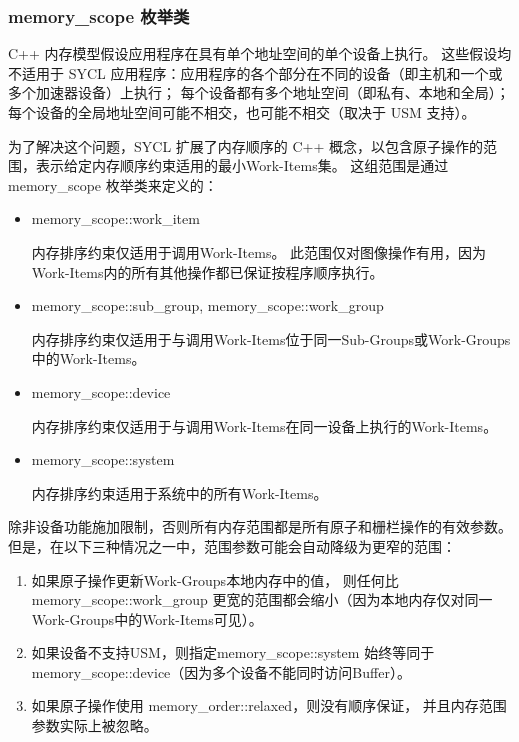\subsubsection{memory\_scope 枚举类}
C++ 内存模型假设应用程序在具有单个地址空间的单个设备上执行。 
这些假设均不适用于 SYCL 应用程序：应用程序的各个部分在不同的设备（即主机和一个或多个加速器设备）上执行； 
每个设备都有多个地址空间（即私有、本地和全局）； 
每个设备的全局地址空间可能不相交，也可能不相交（取决于 USM 支持）。

为了解决这个问题，SYCL 扩展了内存顺序的 C++ 概念，以包含原子操作的范围，表示给定内存顺序约束适用的最小Work-Items集。 
这组范围是通过 memory\_scope 枚举类来定义的：

\begin{itemize}
	\item memory\_scope::work\_item

内存排序约束仅适用于调用Work-Items。 此范围仅对图像操作有用，因为Work-Items内的所有其他操作都已保证按程序顺序执行。

	\item memory\_scope::sub\_group, memory\_scope::work\_group

内存排序约束仅适用于与调用Work-Items位于同一Sub-Groups或Work-Groups中的Work-Items。

	\item memory\_scope::device

内存排序约束仅适用于与调用Work-Items在同一设备上执行的Work-Items。

	\item memory\_scope::system

内存排序约束适用于系统中的所有Work-Items。
\end{itemize}

除非设备功能施加限制，否则所有内存范围都是所有原子和栅栏操作的有效参数。 
但是，在以下三种情况之一中，范围参数可能会自动降级为更窄的范围：

\begin{enumerate}
	\item 如果原子操作更新Work-Groups本地内存中的值，
	则任何比 memory\_scope::work\_group 更宽的范围都会缩小（因为本地内存仅对同一Work-Groups中的Work-Items可见）。

	\item 如果设备不支持USM，则指定memory\_scope::system 
	始终等同于memory\_scope::device（因为多个设备不能同时访问Buffer）。

	\item 如果原子操作使用 memory\_order::relaxed，则没有顺序保证，
	并且内存范围参数实际上被忽略。
\end{enumerate}

